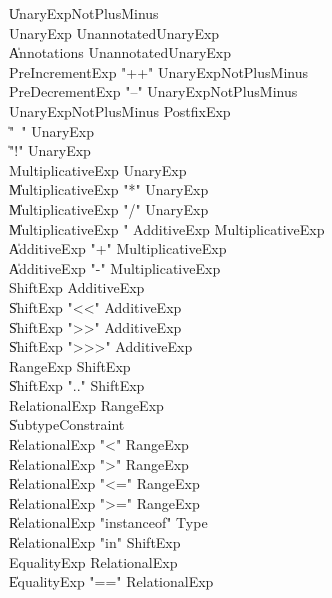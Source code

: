 \begin{grammar}

    \|   UnaryExpNotPlusMinus\\
 UnaryExp  \:   UnannotatedUnaryExp\\
    \|   Annotations  UnannotatedUnaryExp\\
 PreIncrementExp  \:   \xcd"++"  UnaryExpNotPlusMinus\\
 PreDecrementExp  \:   \xcd"--"  UnaryExpNotPlusMinus\\
 UnaryExpNotPlusMinus  \:   PostfixExp\\
    \|   \xcd"~"  UnaryExp\\
    \|   \xcd"!"  UnaryExp\\
 MultiplicativeExp  \:   UnaryExp\\
    \|   MultiplicativeExp  \xcd"*"  UnaryExp\\
    \|   MultiplicativeExp  \xcd"/"  UnaryExp\\
    \|   MultiplicativeExp  \xcd"%
 AdditiveExp  \:   MultiplicativeExp\\
    \|   AdditiveExp  \xcd"+"  MultiplicativeExp\\
    \|   AdditiveExp  \xcd"-"  MultiplicativeExp\\
 ShiftExp  \:   AdditiveExp\\
    \|   ShiftExp  \xcd"<<"  AdditiveExp\\
    \|   ShiftExp  \xcd">>"  AdditiveExp\\
    \|   ShiftExp  \xcd">>>"  AdditiveExp\\
 RangeExp  \:   ShiftExp\\
    \|   ShiftExp    \xcd".."  ShiftExp  \\
 RelationalExp  \:   RangeExp\\
    \|   SubtypeConstraint\\
    \|   RelationalExp  \xcd"<"  RangeExp\\
    \|   RelationalExp  \xcd">"  RangeExp\\
    \|   RelationalExp  \xcd"<="  RangeExp\\
    \|   RelationalExp  \xcd">="  RangeExp\\
    \|   RelationalExp  \xcd"instanceof"  Type\\
    \|   RelationalExp  \xcd"in"  ShiftExp\\
 EqualityExp  \:   RelationalExp\\
    \|   EqualityExp  \xcd"=="  RelationalExp\\

\end{grammar}
